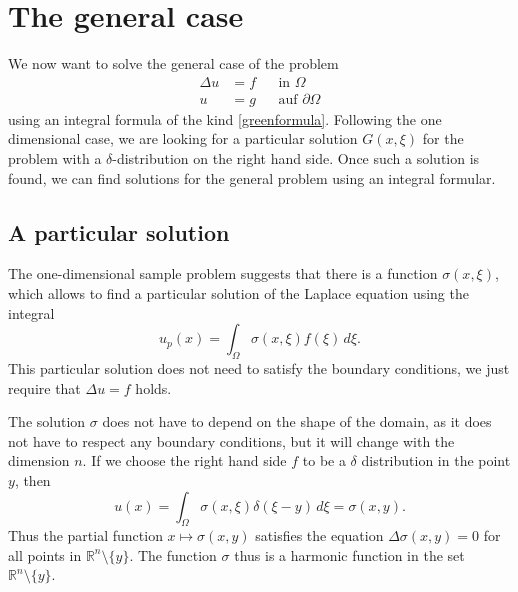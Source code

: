 %
%
%
\section{The general case}
We now want to solve the general case of the problem
\[
\begin{aligned}
\Delta u&=f&&\text{in $\Omega$}\\
u&=g&&\text{auf $\partial\Omega$}
\end{aligned}
\]
using an integral formula of the kind
\eqref{greenformula}.
Following the one dimensional case, we are looking for a particular
solution $G(x,\xi)$ for the problem with a $\delta$-distribution on
the right hand side.
Once such a solution is found, we can find solutions for the general
problem using an integral formular.

\subsection{A particular solution}
The one-dimensional sample problem suggests that there is a function
$\sigma(x,\xi)$, which allows to find a particular solution of the
Laplace equation using the integral
\begin{equation}
u_p(x)=\int_\Omega \sigma(x,\xi)  f(\xi)\,d\xi.
\label{singulaereloesunglaplace}
\end{equation}
This particular solution does not need to satisfy the boundary conditions,
we just require that $\Delta u=f$ holds.

The solution $\sigma$ does not have to depend on the shape of the domain,
as it does not have to respect any boundary conditions,
but it will change with the dimension $n$.
If we choose the right hand side $f$ to be a $\delta$ distribution in the
point $y$, then
\[
u(x)
=
\int_\Omega \sigma(x,\xi)\delta(\xi - y)\,d\xi
=
\sigma(x,y).
\]
Thus the partial function $x\mapsto \sigma(x,y)$ satisfies the equation
$\Delta \sigma(x,y)=0$ for all points in ${\mathbb R}^n\setminus\{y\}$.
The function $\sigma$ thus is a harmonic function in the set
$\mathbb R^n\setminus\{y\}$.

